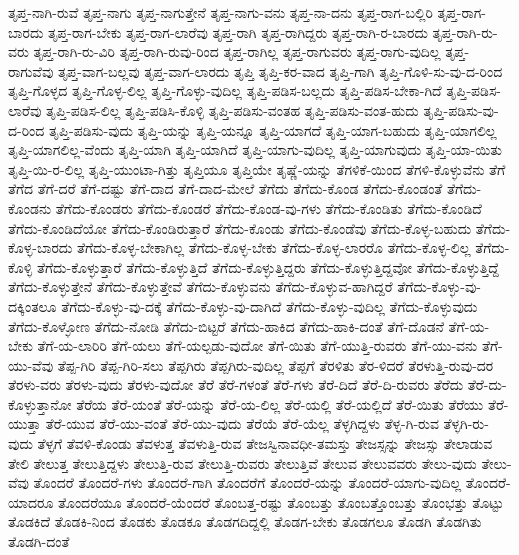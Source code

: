 {ತೃಪ್ತ-ನಾಗಿ-ರುವೆ
ತೃಪ್ತ-ನಾಗು
ತೃಪ್ತ-ನಾಗುತ್ತೇನೆ
ತೃಪ್ತ-ನಾಗು-ವನು
ತೃಪ್ತ-ನಾ-ದನು
ತೃಪ್ತ-ರಾಗ-ಬಲ್ಲಿರಿ
ತೃಪ್ತ-ರಾಗ-ಬಾರದು
ತೃಪ್ತ-ರಾಗ-ಬೇಕು
ತೃಪ್ತ-ರಾಗ-ಲಾರೆವು
ತೃಪ್ತ-ರಾಗಿ
ತೃಪ್ತ-ರಾಗಿದ್ದರು
ತೃಪ್ತ-ರಾಗಿ-ರ-ಬಾರದು
ತೃಪ್ತ-ರಾಗಿ-ರು-ವರು
ತೃಪ್ತ-ರಾಗಿ-ರು-ವಿರಿ
ತೃಪ್ತ-ರಾಗಿ-ರುವು-ರಿಂದ
ತೃಪ್ತ-ರಾಗಿಲ್ಲ
ತೃಪ್ತ-ರಾಗುವರು
ತೃಪ್ತ-ರಾಗು-ವುದಿಲ್ಲ
ತೃಪ್ತ-ರಾಗುವೆವು
ತೃಪ್ತ-ವಾಗ-ಬಲ್ಲವು
ತೃಪ್ತ-ವಾಗ-ಲಾರದು
ತೃಪ್ತಿ
ತೃಪ್ತಿ-ಕರ-ವಾದ
ತೃಪ್ತಿ-ಗಾಗಿ
ತೃಪ್ತಿ-ಗೊಳಿ-ಸು-ವು-ದ-ರಿಂದ
ತೃಪ್ತಿ-ಗೊಳ್ಳದ
ತೃಪ್ತಿ-ಗೊಳ್ಳ-ಲಿಲ್ಲ
ತೃಪ್ತಿ-ಗೊಳ್ಳು-ವುದಿಲ್ಲ
ತೃಪ್ತಿ-ಪಡಿಸ-ಬಲ್ಲದು
ತೃಪ್ತಿ-ಪಡಿಸ-ಬೇಕಾ-ಗಿದೆ
ತೃಪ್ತಿ-ಪಡಿಸ-ಲಾರೆವು
ತೃಪ್ತಿ-ಪಡಿಸ-ಲಿಲ್ಲ
ತೃಪ್ತಿ-ಪಡಿಸಿ-ಕೊಳ್ಳಿ
ತೃಪ್ತಿ-ಪಡಿಸು-ವಂತಹ
ತೃಪ್ತಿ-ಪಡಿಸು-ವಂತ-ಹುದು
ತೃಪ್ತಿ-ಪಡಿಸು-ವು-ದ-ರಿಂದ
ತೃಪ್ತಿ-ಪಡಿಸು-ವುದು
ತೃಪ್ತಿ-ಯನ್ನು
ತೃಪ್ತಿ-ಯನ್ನೂ
ತೃಪ್ತಿ-ಯಾಗದೆ
ತೃಪ್ತಿ-ಯಾಗ-ಬಹುದು
ತೃಪ್ತಿ-ಯಾಗಲಿಲ್ಲ
ತೃಪ್ತಿ-ಯಾಗಲಿಲ್ಲ-ವೆಂದು
ತೃಪ್ತಿ-ಯಾಗಿ
ತೃಪ್ತಿ-ಯಾಗಿದೆ
ತೃಪ್ತಿ-ಯಾಗು-ವುದಿಲ್ಲ
ತೃಪ್ತಿ-ಯಾಗುವುದು
ತೃಪ್ತಿ-ಯಾ-ಯಿತು
ತೃಪ್ತಿ-ಯಿ-ರ-ಲಿಲ್ಲ
ತೃಪ್ತಿ-ಯುಂಟಾ-ಗಿತ್ತು
ತೃಪ್ತಿಯೂ
ತೃಪ್ತಿಯೇ
ತೃಷ್ಣೆ-ಯನ್ನು
ತೆಗಳಿಕೆ-ಯಿಂದ
ತೆಗಳಿ-ಕೊಳ್ಳುವೆನು
ತೆಗೆ
ತೆಗೆದ
ತೆಗೆ-ದರೆ
ತೆಗೆ-ದಷ್ಟು
ತೆಗೆ-ದಾದ
ತೆಗೆ-ದಾದ-ಮೇಲೆ
ತೆಗೆದು
ತೆಗೆದು-ಕೊಂಡ
ತೆಗೆದು-ಕೊಂಡಂತೆ
ತೆಗೆದು-ಕೊಂಡನು
ತೆಗೆದು-ಕೊಂಡರು
ತೆಗೆದು-ಕೊಂಡರೆ
ತೆಗೆದು-ಕೊಂಡ-ವು-ಗಳು
ತೆಗೆದು-ಕೊಂಡಿತು
ತೆಗೆದು-ಕೊಂಡಿದೆ
ತೆಗೆದು-ಕೊಂಡಿದೆಯೋ
ತೆಗೆದು-ಕೊಂಡಿರುತ್ತಾರೆ
ತೆಗೆದು-ಕೊಂಡು
ತೆಗೆದು-ಕೊಂಡೆವು
ತೆಗೆದು-ಕೊಳ್ಳ-ಬಹುದು
ತೆಗೆದು-ಕೊಳ್ಳ-ಬಾರದು
ತೆಗೆದು-ಕೊಳ್ಳ-ಬೇಕಾಗಿಲ್ಲ
ತೆಗೆದು-ಕೊಳ್ಳ-ಬೇಕು
ತೆಗೆದು-ಕೊಳ್ಳ-ಲಾರರೊ
ತೆಗೆದು-ಕೊಳ್ಳ-ಲಿಲ್ಲ
ತೆಗೆದು-ಕೊಳ್ಳಿ
ತೆಗೆದು-ಕೊಳ್ಳುತ್ತಾರೆ
ತೆಗೆದು-ಕೊಳ್ಳುತ್ತಿದೆ
ತೆಗೆದು-ಕೊಳ್ಳುತ್ತಿದ್ದರು
ತೆಗೆದು-ಕೊಳ್ಳುತ್ತಿದ್ದವೋ
ತೆಗೆದು-ಕೊಳ್ಳುತ್ತಿದ್ದೆ
ತೆಗೆದು-ಕೊಳ್ಳುತ್ತೇನೆ
ತೆಗೆದು-ಕೊಳ್ಳುತ್ತೇವೆ
ತೆಗೆದು-ಕೊಳ್ಳುವನು
ತೆಗೆದು-ಕೊಳ್ಳುವ-ಹಾಗಿದ್ದರೆ
ತೆಗೆದು-ಕೊಳ್ಳು-ವು-ದಕ್ಕಿಂತಲೂ
ತೆಗೆದು-ಕೊಳ್ಳು-ವು-ದಕ್ಕೆ
ತೆಗೆದು-ಕೊಳ್ಳು-ವು-ದಾಗಿದೆ
ತೆಗೆದು-ಕೊಳ್ಳು-ವುದಿಲ್ಲ
ತೆಗೆದು-ಕೊಳ್ಳುವುದು
ತೆಗೆದು-ಕೊಳ್ಳೋಣ
ತೆಗೆದು-ನೋಡಿ
ತೆಗೆದು-ಬಿಟ್ಟರೆ
ತೆಗೆದು-ಹಾಕಿದ
ತೆಗೆದು-ಹಾಕಿ-ದಂತೆ
ತೆಗೆ-ದೊಡನೆ
ತೆಗೆ-ಯ-ಬೇಕು
ತೆಗೆ-ಯ-ಲಾರಿರಿ
ತೆಗೆ-ಯಲು
ತೆಗೆ-ಯಲ್ಪಡು-ವುದೋ
ತೆಗೆ-ಯಿತು
ತೆಗೆ-ಯುತ್ತಿ-ರುವರು
ತೆಗೆ-ಯು-ವನು
ತೆಗೆ-ಯು-ವೆವು
ತೆಪ್ಪ-ಗಿರಿ
ತೆಪ್ಪ-ಗಿರಿ-ಸಲು
ತೆಪ್ಪಗಿರು
ತೆಪ್ಪಗಿರು-ವುದಿಲ್ಲ
ತೆಪ್ಪಗೆ
ತೆರಳಿತು
ತೆರ-ಳಿದರೆ
ತೆರಳುತ್ತಿ-ರುವು-ದರ
ತೆರಳು-ವರು
ತೆರಳು-ವುದು
ತೆರಳು-ವುದೋ
ತೆರೆ
ತೆರೆ-ಗಳಂತೆ
ತೆರೆ-ಗಳು
ತೆರೆ-ದಿದೆ
ತೆರೆ-ದಿ-ರುವರು
ತೆರೆದು
ತೆರೆ-ದು-ಕೊಳ್ಳುತ್ತಾನೋ
ತೆರೆಯ
ತೆರೆ-ಯಂತೆ
ತೆರೆ-ಯನ್ನು
ತೆರೆ-ಯ-ಲಿಲ್ಲ
ತೆರೆ-ಯಲ್ಲಿ
ತೆರೆ-ಯಲ್ಲಿದೆ
ತೆರೆ-ಯಿತು
ತೆರೆಯು
ತೆರೆ-ಯುತ್ತಾ
ತೆರೆ-ಯುವ
ತೆರೆ-ಯು-ವಂತೆ
ತೆರೆ-ಯು-ವುದು
ತೆರೆಯೆ
ತೆರೆ-ಯೆಲ್ಲ
ತೆಳ್ಳಗಿದ್ದಳು
ತೆಳ್ಳ-ಗಿ-ರುವ
ತೆಳ್ಳಗಿ-ರು-ವುದು
ತೆಳ್ಳಗೆ
ತೆವಳಿ-ಕೊಂಡು
ತೆವಳುತ್ತ
ತೆವಳುತ್ತಿ-ರುವ
ತೇಜಸ್ವಿನಾವಧೀ-ತಮಸ್ತು
ತೇಜಸ್ಸನ್ನು
ತೇಜಸ್ಸು
ತೇಲಾಡುವ
ತೇಲಿ
ತೇಲುತ್ತ
ತೇಲುತ್ತಿದ್ದಳು
ತೇಲುತ್ತಿ-ರುವ
ತೇಲುತ್ತಿ-ರುವರು
ತೇಲುತ್ತಿವೆ
ತೇಲುವ
ತೇಲುವವರು
ತೇಲು-ವುದು
ತೇಲು-ವೆವು
ತೊಂದರೆ
ತೊಂದರೆ-ಗಳು
ತೊಂದರೆ-ಗಾಗಿ
ತೊಂದರೆಗೆ
ತೊಂದರೆ-ಯನ್ನು
ತೊಂದರೆ-ಯಾಗು-ವುದಿಲ್ಲ
ತೊಂದರೆ-ಯಾದರೂ
ತೊಂದರೆಯೂ
ತೊಂದರೆ-ಯೆಂದರೆ
ತೊಂಬತ್ತ-ರಷ್ಟು
ತೊಂಬತ್ತು
ತೊಂಬತ್ತೊಂಬತ್ತು
ತೊಂಭತ್ತು
ತೊಟ್ಟು
ತೊಡಕಿದೆ
ತೊಡಕಿ-ನಿಂದ
ತೊಡಕು
ತೊಡಕೂ
ತೊಡಗದಿದ್ದಲ್ಲಿ
ತೊಡಗ-ಬೇಕು
ತೊಡಗಲೂ
ತೊಡಗಿ
ತೊಡಗಿತು
ತೊಡಗಿ-ದಂತೆ
}
